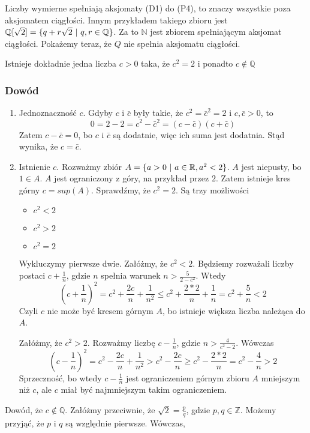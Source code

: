 \documentclass[9pt]{article}
\begin{document}
Liczby wymierne spełniają aksjomaty (D1) do (P4), to znaczy wszystkie poza aksjomatem ciągłości.
Innym przykładem takiego zbioru jest $\mathbb{Q}[\sqrt{2}] = \{q + r\sqrt{2} \ |\  q,r \in
\mathbb{Q}\}$. Za to $\mathbb{N}$ jest zbiorem spełniającym aksjomat ciągłości. Pokażemy teraz, że
$Q$ nie spełnia aksjomatu ciągłości.

\begin{Twi}
    Istnieje dokładnie jedna liczba $c > 0$ taka, że $c^2 = 2$ i ponadto $c \notin \mathbb{Q}$
\end{Twi}

\subsubsection*{Dowód}
\begin{enumerate}
    \item Jednoznaczność $c$. Gdyby $c$ i $\bar{c}$ były takie, że $c^2 = \bar{c}^2 = 2$ i 
        $c, \bar{c} > 0$, to 
        \[
            0 = 2-2 = c^2 - \bar{c}^2 = (c-\bar{c})(c + \bar{c})
        \]
        Zatem $c-\bar{c} = 0$, bo $c$ i $\bar{c}$ są dodatnie, więc ich suma jest dodatnia. Stąd
        wynika, że $c = \bar{c}$.
    \item Istnienie $c$. Rozważmy zbiór $A = \{a > 0 \ |\  a\in \mathbb{R}, a^2 < 2\}$. $A$ jest
        niepusty, bo $1 \in A$. $A$ jest ograniczony z góry, na przykład przez $2$. Zatem
        istnieje kres górny $c = sup(A)$. Sprawdźmy, że $c^2 = 2$. Są trzy możliwości
        \begin{itemize}
            \item $c^2 < 2$
            \item $c^2 > 2$
            \item $c^2 = 2$
        \end{itemize}
        Wykluczymy pierwsze dwie. Załóżmy, że $c^2 < 2$. Będziemy rozważali liczby postaci $c +
        \frac{1}{n}$, gdzie $n$ spełnia warunek $n > \frac{5}{2-c^2}$. Wtedy
        \[
            \left(c+\frac{1}{n}\right)^2 = c^2 + \frac{2c}{n}+ \frac{1}{n^2} \le c^2 +
            \frac{2*2}{n} + \frac{1}{n} = c^2 + \frac{5}{n} < 2
        \]
        Czyli $c$ nie może być kresem górnym $A$, bo istnieje większa liczba należąca do $A$.

        Załóżmy, że $c^2 > 2$. Rozważmy liczbę $c-\frac{1}{n}$, gdzie $n > \frac{4}{c^2-2}$.
        Wówczas
        \[
            \left(c-\frac{1}{n}\right)^2 = c^2 - \frac{2c}{n} + \frac{1}{n^2} > c^2 -
            \frac{2c}{n} \ge c^2 - \frac{2*2}{n} = c^2 - \frac{4}{n} > 2
        \]
        Sprzeczność, bo wtedy $c-\frac{1}{n}$ jest ograniczeniem górnym zbioru $A$ mniejszym niż
        $c$, ale $c$ miał być najmniejszym takim ograniczeniem.
\end{enumerate}
Dowód, że $c \notin \mathbb{Q}$. Załóżmy przeciwnie, że $\sqrt{2} = \frac{p}{q}$, gdzie $p, q \in
\mathbb{Z}$. Możemy przyjąć, że $p$ i $q$ są względnie pierwsze. Wówczas,
\end{document}
